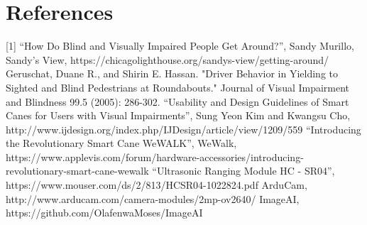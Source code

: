 \section{References}
[1] “How Do Blind and Visually Impaired People Get Around?”, Sandy Murillo, Sandy’s View, https://chicagolighthouse.org/sandys-view/getting-around/ 
\newline
[2] Geruschat, Duane R., and Shirin E. Hassan. "Driver Behavior in Yielding to Sighted and Blind Pedestrians at Roundabouts." Journal of Visual Impairment and Blindness 99.5 (2005): 286-302.
\newline
[3] “Usability and Design Guidelines of Smart Canes for Users with Visual Impairments”, Sung Yeon Kim and Kwangsu Cho, 
\newline
http://www.ijdesign.org/index.php/IJDesign/article/view/1209/559 
\newline
[4] “Introducing the Revolutionary Smart Cane WeWALK”, WeWalk, https://www.applevis.com/forum/hardware-accessories/introducing-revolutionary-smart-cane-wewalk
\newline
[5] “Ultrasonic Ranging Module HC - SR04”, 
\newline
https://www.mouser.com/ds/2/813/HCSR04-1022824.pdf
\newline
[6] ArduCam, http://www.arducam.com/camera-modules/2mp-ov2640/
\newline
[7] ImageAI, https://github.com/OlafenwaMoses/ImageAI


% 